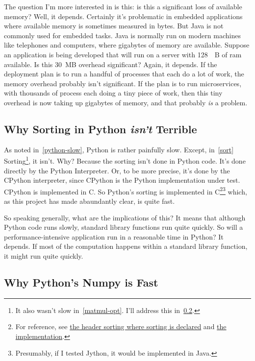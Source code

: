 \documentclass[12pt,letterpaper]{article}
\begin{document}
The question I'm more interested in is this: is this a significant loss of
available memory? Well, it depends. Certainly it's problematic in embedded
applications where available memory is sometimes measured in bytes. But Java is
not commonly used for embedded tasks. Java is normally run on modern machines
like telephones and computers, where gigabytes of memory are available. Suppose
an application is being developed that will run on a server with \SI{128}{\giga
B} of ram available. Is this \SI{30}{\mega B} overhead significant? Again, it
depends. If the deployment plan is to run a handful of processes that each do
a lot of work, the memory overhead probably isn't significant. If the plan is
to run microservices, with thousands of process each doing a tiny piece of
work, then this tiny overhead is now taking up gigabytes of memory, and that
probably \emph{is} a problem.

\subsection{Why Sorting in Python \emph{isn't} Terrible}

As noted in~\ref{python-slow}, Python is rather painfully slow. Except,
in~\ref{sort} Sorting\footnote{It also wasn't slow in~\ref{matmul-opt}. I'll
address this in~\ref{numpy-blas}.}, it isn't. Why? Because the sorting isn't done
in Python code. It's done directly by the Python Interpreter. Or, to be more
precise, it's done by the CPython interpreter, since CPython is the Python
implementation under test. CPython is implemented in C. So Python's sorting is
implemented in C\footnote{For reference, see
\href{https://github.com/python/cpython/blob/f348154c8f8a9c254503306c59d6779d4d09b3a9/Include/listobject.h#L39}{the
header sorting where sorting is declared} and
\href{https://github.com/python/cpython/blob/f348154c8f8a9c254503306c59d6779d4d09b3a9/Objects/listobject.c#L2567-L2579}{the
implementation}.}\footnote{Presumably, if I tested Jython, it would be
implemented in Java.} which, as this project has made abaundantly clear, is
quite fast.

So speaking generally, what are the implications of this? It means that
although Python code runs slowly, standard library functions run quite quickly.
So will a performance-intensive application run in a reasonable time in Python?
It depends. If most of the computation happens within a standard library
function, it might run quite quickly.

\subsection{Why Python's Numpy is Fast}\label{numpy-blas}
\end{document}

